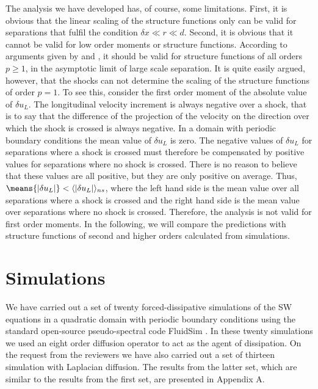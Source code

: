 The analysis we have developed has, of course, some limitations. First, it is obvious that  the linear scaling of the structure functions only can be valid for separations  that fulfil the condition $ \delta x \ll r \ll d $.  Second, it is obvious that it  cannot be valid for low order moments or structure functions. According to arguments given by  \cite{BouchaudMezardParisi1995}  and \cite{Weinan}, it should be valid for structure functions of all orders $ p  \ge 1 $, in the asymptotic limit of large scale separation.  It is quite easily argued, however, that the shocks can not determine the scaling of the structure functions of order $ p=1 $. 
To see this, consider the first order moment of the absolute value of $ \delta u_L $. 
The longitudinal velocity increment is always negative over a shock, that is to say that the difference of the projection of the velocity on the direction over which the shock is crossed is always negative. In a domain with periodic boundary conditions the mean value of $ \delta u_L $   is zero. The negative values of $ \delta u_L $ for separations where a shock is crossed must therefore be compensated by positive values for separations where no shock is crossed. There is no reason to believe that these values are all positive,  but they are only positive on average. Thus, 
$ \means{ |\delta u_L | } < \langle | \delta u_L | \rangle _{ns} $, where the left hand side is the mean value over all separations where a shock is crossed and the right hand side is the mean value over separations where no shock is crossed.  Therefore, the analysis is not valid for first order moments. In the following, we will compare the predictions with structure functions of second and higher orders calculated from simulations. 









\section{Simulations}

We have carried out a set of twenty forced-dissipative simulations of the SW
equations in a quadratic domain with periodic boundary conditions using the
standard open-source pseudo-spectral code FluidSim \cite[]{fluiddyn, fluidfft,
fluidsim}. In these twenty simulations we used an eight order diffusion operator to act as the agent of dissipation. 
 On the request from the reviewers we have also carried out a set of thirteen simulation with  Laplacian diffusion. The results from the latter set, which are similar to the results from the first set,  are presented in Appendix A.

